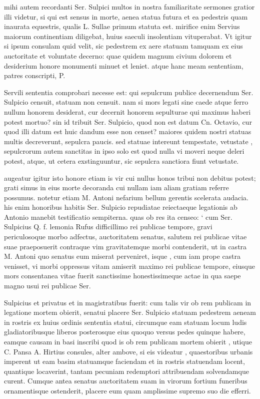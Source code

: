  mihi autem recordanti Ser. Sulpici multos in nostra familiaritate sermones gratior illi videtur, si qui est sensus in morte, aenea statua futura et ea pedestris quam inaurata equestris, qualis L. Sullae primum statuta est. mirifice enim Servius maiorum continentiam diligebat, huius saeculi insolentiam vituperabat. Vt igitur si ipsum consulam quid velit, sic pedestrem ex aere statuam tamquam ex eius auctoritate et voluntate decerno: quae quidem magnum civium dolorem et desiderium honore monumenti minuet et leniet. atque hanc meam sententiam, patres conscripti, P.

 Servili sententia comprobari necesse est: qui sepulcrum publice decernendum Ser. Sulpicio censuit, statuam non censuit. nam si mors legati sine caede atque ferro nullum honorem desiderat, cur decernit honorem sepulturae qui maximus haberi potest mortuo? sin id tribuit Ser. Sulpicio, quod non est datum Cn. Octavio, cur quod illi datum est huic dandum esse non censet? maiores quidem nostri statuas multis decreverunt, sepulcra paucis. sed statuae intereunt tempestate, vetustate , sepulcrorum autem sanctitas in ipso solo est quod nulla vi moveri neque deleri potest, atque, ut cetera exstinguuntur, sic sepulcra sanctiora fiunt vetustate.

 augeatur igitur isto honore etiam is vir cui nullus honos tribui non debitus potest; grati simus in eius morte decoranda cui nullam iam aliam gratiam referre possumus. notetur etiam M. Antoni nefarium bellum gerentis scelerata audacia. his enim honoribus habitis Ser. Sulpicio repudiatae reiectaeque legationis ab Antonio manebit testificatio sempiterna. quas ob res ita censeo: ` cum Ser. Sulpicius Q. f. lemonia Rufus difficillimo rei publicae tempore, gravi periculosoque morbo adfectus, auctoritatem senatus, salutem rei publicae vitae suae praeposuerit contraque vim gravitatemque morbi contenderit, ut in castra M. Antoni quo senatus eum miserat perveniret, isque , cum iam prope castra venisset, vi morbi oppressus vitam amiserit maximo rei publicae tempore, eiusque mors consentanea vitae fuerit sanctissime honestissimeque actae in qua saepe magno usui rei publicae Ser.

 Sulpicius et privatus et in magistratibus fuerit: cum talis vir ob rem publicam in legatione mortem obierit, senatui placere Ser. Sulpicio statuam pedestrem aeneam in rostris ex huius ordinis sententia statui, circumque eam statuam locum ludis gladiatoribusque liberos posterosque eius quoquo versus pedes quinque habere, eamque causam in basi inscribi quod is ob rem publicam mortem obierit , utique C. Pansa A. Hirtius consules, alter ambove, si eis videatur , quaestoribus urbanis imperent ut eam basim statuamque faciendam et in rostris statuendam locent, quantique locaverint, tantam pecuniam redemptori attribuendam solvendamque curent. Cumque antea senatus auctoritatem suam in virorum fortium funeribus ornamentisque ostenderit, placere eum quam amplissime supremo suo die efferri.

